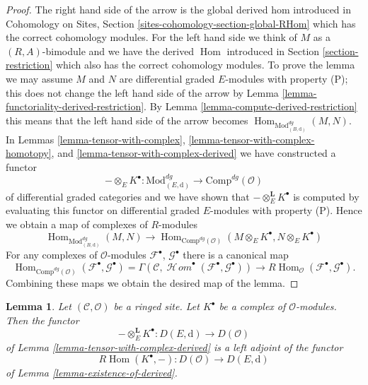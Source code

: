 \documentclass{stacks-project}
\theoremstyle{plain}
\newtheorem{lemma}[subsection]{Lemma}
\theoremstyle{definition}
\theoremstyle{remark}
\numberwithin{equation}{subsection}
\def\Hom{\mathop{\mathrm{Hom}}\nolimits}
\def\SheafHom{\mathop{\mathcal{H}\!\mathit{om}}\nolimits}
\begin{document}
\begin{proof}
The right hand side of the arrow is the global derived hom introduced
in Cohomology on Sites, Section \ref{sites-cohomology-section-global-RHom}
which has the correct cohomology modules.
For the left hand side we think of $M$ as a $(R, A)$-bimodule and
we have the derived $\Hom$ introduced in Section \ref{section-restriction}
which also has the correct cohomology modules.
To prove the lemma we may assume $M$ and $N$ are differential graded
$E$-modules with property (P); this does not change the left hand
side of the arrow by
Lemma \ref{lemma-functoriality-derived-restriction}.
By Lemma \ref{lemma-compute-derived-restriction}
this means that the left hand side of the arrow becomes
$\Hom_{\text{Mod}^{dg}_{(B, \text{d})}}(M, N)$.
In Lemmas \ref{lemma-tensor-with-complex},
\ref{lemma-tensor-with-complex-homotopy}, and
\ref{lemma-tensor-with-complex-derived}
we have constructed a functor
$$
- \otimes_E K^\bullet :
\text{Mod}^{dg}_{(E, \text{d})}
\longrightarrow
\text{Comp}^{dg}(\mathcal{O})
$$
of differential graded categories
and we have shown that $- \otimes_E^\mathbf{L} K^\bullet$ is computed
by evaluating this functor
on differential graded $E$-modules with property (P).
Hence we obtain a map of complexes of $R$-modules
$$
\Hom_{\text{Mod}^{dg}_{(B, \text{d})}}(M, N)
\longrightarrow
\Hom_{\text{Comp}^{dg}(\mathcal{O})}
(M \otimes_E K^\bullet, N \otimes_E K^\bullet)
$$
For any complexes of $\mathcal{O}$-modules
$\mathcal{F}^\bullet$, $\mathcal{G}^\bullet$ there
is a canonical map
$$
\Hom_{\text{Comp}^{dg}(\mathcal{O})}
(\mathcal{F}^\bullet, \mathcal{G}^\bullet) =
\Gamma(\mathcal{C},
\SheafHom^\bullet(\mathcal{F}^\bullet, \mathcal{G}^\bullet))
\longrightarrow
R\Hom_\mathcal{O}(\mathcal{F}^\bullet, \mathcal{G}^\bullet).
$$
Combining these maps
we obtain the desired map of the lemma.
\end{proof}

\begin{lemma}
\label{lemma-tensor-with-complex-hom-adjoint}
Let $(\mathcal{C}, \mathcal{O})$ be a ringed site.
Let $K^\bullet$ be a complex of $\mathcal{O}$-modules.
Then the functor
$$
- \otimes_E^\mathbf{L} K^\bullet :
D(E, \text{d})
\longrightarrow
D(\mathcal{O})
$$
of Lemma \ref{lemma-tensor-with-complex-derived} is a left adjoint
of the functor
$$
R\Hom(K^\bullet, -) : D(\mathcal{O}) \longrightarrow D(E, \text{d})
$$
of Lemma \ref{lemma-existence-of-derived}.
\end{lemma}
\end{document}

